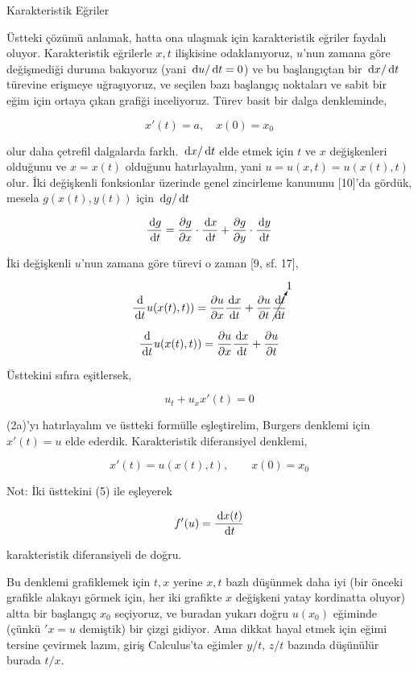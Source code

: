 \documentclass[12pt,fleqn]{article}\usepackage{../../common}
\begin{document}
Karakteristik Eğriler

Üstteki çözümü anlamak, hatta ona ulaşmak için karakteristik eğriler faydalı
oluyor. Karakteristik eğrilerle $x,t$ ilişkisine odaklanıyoruz, $u$'nun zamana
göre değişmediği duruma bakıyoruz (yani $\,\mathrm{d} u / \,\mathrm{d} t = 0$) ve bu başlangıçtan
bir $\,\mathrm{d} x / \,\mathrm{d} t$ türevine erişmeye uğraşıyoruz, ve seçilen bazı başlangıç
noktaları ve sabit bir eğim için ortaya çıkan grafiği inceliyoruz. Türev basit
bir dalga denkleminde,

$$
x'(t) = a, \quad x(0) = x_0
$$

olur daha çetrefil dalgalarda farklı. $\,\mathrm{d} x / \,\mathrm{d} t$ elde etmek için $t$ ve $x$
değişkenleri olduğunu ve $x = x(t)$ olduğunu hatırlayalım, yani $u = u(x,t) =
u(x(t),t)$ olur. İki değişkenli fonksionlar üzerinde genel zincirleme kanununu
[10]'da gördük, mesela $g(x(t),y(t))$ için $\,\mathrm{d} g / \,\mathrm{d} t$

$$
\frac{\,\mathrm{d} g}{\,\mathrm{d} t} =
\frac{\partial g}{\partial x} \cdot \frac{\,\mathrm{d} x}{\,\mathrm{d} t} +
\frac{\partial g}{\partial y} \cdot \frac{\,\mathrm{d} y}{\,\mathrm{d} t} 
$$

İki değişkenli $u$'nun zamana göre türevi o zaman [9, sf. 17],

$$
\frac{\,\mathrm{d}}{\,\mathrm{d} t} u (x(t),t)) =
\frac{\partial u}{\partial x} \frac{\,\mathrm{d} x}{\,\mathrm{d} t} +
\frac{\partial u}{\partial t} \cancelto{1}{\frac{\,\mathrm{d} t}{\,\mathrm{d} t}}
$$

$$
\frac{\,\mathrm{d}}{\,\mathrm{d} t} u (x(t),t)) =
\frac{\partial u}{\partial x} \frac{\,\mathrm{d} x}{\,\mathrm{d} t} +
\frac{\partial u}{\partial t}
$$

Üsttekini sıfıra eşitlersek, 

$$
u_t  + u_x x'(t) = 0
$$

(2a)'yı hatırlayalım ve üstteki formülle eşleştirelim, Burgers denklemi için
$x'(t) = u$ elde ederdik. Karakteristik diferansiyel denklemi,

$$
x'(t) = u(x(t),t), \qquad x(0) = x_0
$$

Not: İki üsttekini (5) ile eşleyerek

$$
f'(u) = \frac{\,\mathrm{d} x(t)}{\,\mathrm{d} t}
$$

karakteristik diferansiyeli de doğru.

Bu denklemi grafiklemek için $t,x$ yerine $x,t$ bazlı düşünmek daha iyi (bir
önceki grafikle alakayı görmek için, her iki grafikte $x$ değişkeni yatay
kordinatta oluyor) altta bir başlangıç $x_0$ seçiyoruz, ve buradan yukarı doğru
$u(x_0)$ eğiminde (çünkü $'x = u$ demiştik) bir çizgi gidiyor. Ama dikkat hayal
etmek için eğimi tersine çevirmek lazım, giriş Calculus'ta eğimler $y/t$, $z/t$
bazında düşünülür burada $t/x$.
\end{document}
